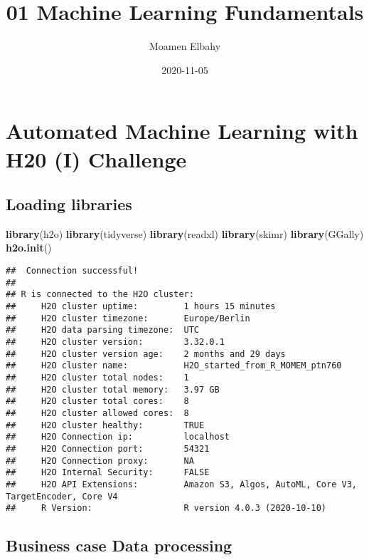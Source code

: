 \documentclass[
]{article}
\title{01 Machine Learning Fundamentals}
\author{Moamen Elbahy}
\date{2020-11-05}
\newenvironment{Shaded}{\begin{snugshade}}{\end{snugshade}}
\newcommand{\KeywordTok}[1]{\textcolor[rgb]{0.13,0.29,0.53}{\textbf{#1}}}
\newcommand{\NormalTok}[1]{#1}
\begin{document}
\maketitle

{
\setcounter{tocdepth}{3}
\tableofcontents
}
\hypertarget{automated-machine-learning-with-h20-i-challenge}{%
\section{Automated Machine Learning with H20 (I)
Challenge}\label{automated-machine-learning-with-h20-i-challenge}}

\hypertarget{loading-libraries}{%
\subsection{Loading libraries}\label{loading-libraries}}

\begin{Shaded}
\begin{Highlighting}[]
\KeywordTok{library}\NormalTok{(h2o)}
\KeywordTok{library}\NormalTok{(tidyverse)}
\KeywordTok{library}\NormalTok{(readxl)}
\KeywordTok{library}\NormalTok{(skimr)}
\KeywordTok{library}\NormalTok{(GGally)}
\KeywordTok{h2o.init}\NormalTok{()}
\end{Highlighting}
\end{Shaded}

\begin{verbatim}
##  Connection successful!
## 
## R is connected to the H2O cluster: 
##     H2O cluster uptime:         1 hours 15 minutes 
##     H2O cluster timezone:       Europe/Berlin 
##     H2O data parsing timezone:  UTC 
##     H2O cluster version:        3.32.0.1 
##     H2O cluster version age:    2 months and 29 days  
##     H2O cluster name:           H2O_started_from_R_MOMEM_ptn760 
##     H2O cluster total nodes:    1 
##     H2O cluster total memory:   3.97 GB 
##     H2O cluster total cores:    8 
##     H2O cluster allowed cores:  8 
##     H2O cluster healthy:        TRUE 
##     H2O Connection ip:          localhost 
##     H2O Connection port:        54321 
##     H2O Connection proxy:       NA 
##     H2O Internal Security:      FALSE 
##     H2O API Extensions:         Amazon S3, Algos, AutoML, Core V3, TargetEncoder, Core V4 
##     R Version:                  R version 4.0.3 (2020-10-10)
\end{verbatim}

\hypertarget{business-case-data-processing}{%
\subsection{Business case Data
processing}\label{business-case-data-processing}}
\end{document}
